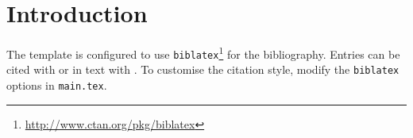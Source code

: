 \chapter{Introduction}
\label{ch:introduction}
The template is configured to use \texttt{biblatex}\footnote{\url{http://www.ctan.org/pkg/biblatex}} for the bibliography. Entries can be cited with \citep{achiam2017Constrained} or in text with \cite{achiam2017Constrained}. To customise the citation style, modify the \texttt{biblatex} options in \texttt{main.tex}.

